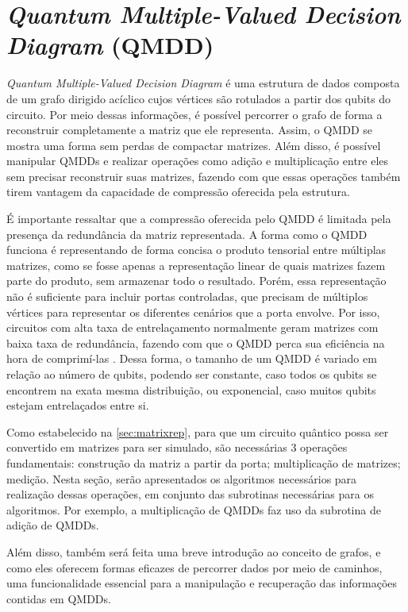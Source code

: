 \chapter{{\itshape Quantum Multiple-Valued Decision Diagram} (QMDD)}\label{chap:qmdd}

{\itshape Quantum Multiple-Valued Decision Diagram} é uma estrutura de dados composta de um grafo dirigido acíclico cujos vértices são rotulados a partir dos qubits do circuito. Por meio dessas informações, é possível percorrer o grafo de forma a reconstruir completamente a matriz que ele representa. Assim, o QMDD se mostra uma forma sem perdas de compactar matrizes. Além disso, é possível manipular QMDDs e realizar operações como adição e multiplicação entre eles sem precisar reconstruir suas matrizes, fazendo com que essas operações também tirem vantagem da capacidade de compressão oferecida pela estrutura. \cite{miller2006qmdd}

É importante ressaltar que a compressão oferecida pelo QMDD é limitada pela presença da redundância da matriz representada. A forma como o QMDD funciona é representando de forma concisa o produto tensorial entre múltiplas matrizes, como se fosse apenas a representação linear de quais matrizes fazem parte do produto, sem armazenar todo o resultado. Porém, essa representação não é suficiente para incluir portas controladas, que precisam de múltiplos vértices para representar os diferentes cenários que a porta envolve. Por isso, circuitos com alta taxa de entrelaçamento normalmente geram matrizes com baixa taxa de redundância, fazendo com que o QMDD perca sua eficiência na hora de comprimí-las \cite{kydros2025tutorial}. Dessa forma, o tamanho de um QMDD é variado em relação ao número de qubits, podendo ser constante, caso todos os qubits se encontrem na exata mesma distribuição, ou exponencial, caso muitos qubits estejam entrelaçados entre si.

Como estabelecido na \cref{sec:matrixrep}, para que um circuito quântico possa ser convertido em matrizes para ser simulado, são necessárias 3 operações fundamentais: construção da matriz a partir da porta; multiplicação de matrizes; medição. Nesta seção, serão apresentados os algoritmos necessários para realização dessas operações, em conjunto das subrotinas necessárias para os algoritmos. Por exemplo, a multiplicação de QMDDs faz uso da subrotina de adição de QMDDs.

Além disso, também será feita uma breve introdução ao conceito de grafos, e como eles oferecem formas eficazes de percorrer dados por meio de caminhos, uma funcionalidade essencial para a manipulação e recuperação das informações contidas em QMDDs.

